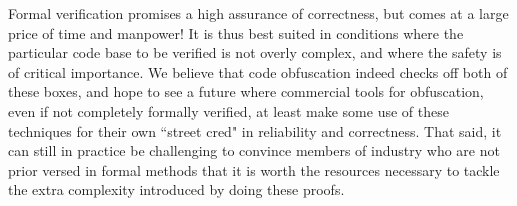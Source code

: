 \documentclass[12pt,notitlepage]{report}
\theoremstyle{plain}
\theoremstyle{definition}
\numberwithin{equation}{section}
\begin{document}
\par Formal verification promises a high assurance of correctness, but comes at a large price of time and manpower!  It is thus best suited in conditions where the particular code base to be verified is not overly complex, and where the safety is of critical importance.  We believe that code obfuscation indeed checks off both of these boxes, and hope to see a future where commercial tools for obfuscation, even if not completely formally verified, at least make some use of these techniques for their own ``street cred" in reliability and correctness.  That said, it can still in practice be challenging to convince members of industry who are not prior versed in formal methods that it is worth the resources necessary to tackle the extra complexity introduced by doing these proofs.
\end{document}
